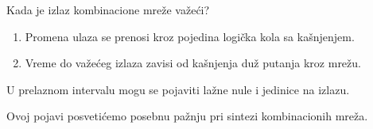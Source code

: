 \begin{frame}[label=02-s006]{Kada je izlaz kombinacione mreže važeći?}
\par{}
\par\vspace{5mm}
\begin{enumerate}
\item Promena ulaza se prenosi kroz pojedina logička kola sa kašnjenjem.
\item Vreme do važećeg izlaza zavisi od kašnjenja duž putanja kroz mrežu.
\end{enumerate}
\par\vspace{5mm}
\par\vspace{2mm}
U prelaznom intervalu mogu se pojaviti \alert{lažne nule i jedinice} na izlazu.\par\vspace{3mm}
Ovoj pojavi posvetićemo posebnu pažnju pri sintezi kombinacionih mreža.
\end{frame}
